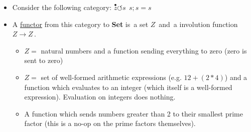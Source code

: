 \begin{itemize}
    \item Consider the following category: $\boxed{\overset{\bullet}{z}\circlearrowleft s\ \ \boxed{s;s = s}}$
    \item A \hyperref[D3.35]{functor} from this category to \textbf{Set} is \,a set $Z$\, and \,a involution function $Z \rightarrow Z$\,.
          \begin{itemize}
            \item $Z =$ natural numbers and a function sending everything to zero (zero is sent to zero)
            \item $Z =$ set of well-formed arithmetic expressions (e.g. $12+(2*4)$) and a function which evaluates to an integer (which itself is a well-formed expression). Evaluation on integers does nothing.
            \item A function which sends numbers greater than 2 to their smallest prime factor (this is a no-op on the prime factors themselves).
          \end{itemize}
  \end{itemize}

